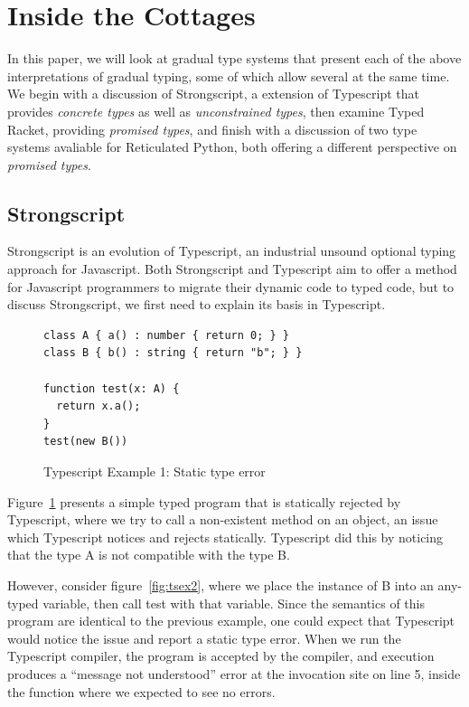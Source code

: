 \documentclass[preprint]{sigplanconf}
\begin{document}
\section{Inside the Cottages}

In this paper, we will look at gradual type systems that present each of the
above interpretations of gradual typing, some of which allow several at the 
same time. We begin with a discussion of Strongscript, a extension of Typescript
that provides \emph{concrete types} as well as \emph{unconstrained types}, then
examine Typed Racket, providing \emph{promised types}, and finish with a
discussion of two type systems avaliable for Reticulated Python, both offering
a different perspective on \emph{promised types}. 

\subsection{Strongscript}

Strongscript is an evolution of Typescript, an industrial unsound optional
typing approach for Javascript. Both Strongscript and Typescript aim to
offer a method for Javascript programmers to migrate their dynamic code
to typed code, but to discuss Strongscript, we first need to explain its 
basis in Typescript.

\begin{figure}[h]
\begin{verbatim}
class A { a() : number { return 0; } }
class B { b() : string { return "b"; } }

function test(x: A) {
  return x.a();
}
test(new B())
\end{verbatim}
\caption{Typescript Example 1: Static type error}
\label{fig:tsex1}
\end{figure}

Figure~\ref{fig:tsex1} presents a simple typed program that is statically 
rejected by Typescript, where we try to call a non-existent method on an object,
an issue which Typescript notices and rejects statically. Typescript did this
by noticing that the type A is not compatible with the type B.

However, consider figure~\ref{fig:tsex2}, where we place the instance of B into
an any-typed variable, then call test with that variable. Since the semantics of 
this program are identical to the previous example, one could expect that Typescript 
would notice the issue and report a static type error. When we run the Typescript
compiler, the program is accepted by the compiler, and execution produces a ``message not 
understood'' error at the  invocation site on line 5, inside the function where we expected
to see no errors. 
\end{document}
